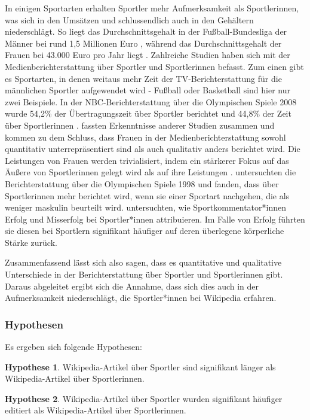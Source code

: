 \documentclass[11pt]{article}
\begin{document}
In einigen Sportarten erhalten Sportler mehr Aufmerksamkeit als Sportlerinnen, was sich in den Umsätzen und schlussendlich auch in den Gehältern niederschlägt. So liegt das Durchschnittsgehalt in der Fußball-Bundesliga der Männer bei rund 1,5 Millionen Euro \parencite{Harris2015}, während das Durchschnittsgehalt der Frauen bei 43.000 Euro pro Jahr liegt \parencite{soccerIncomeWomen}. Zahlreiche Studien haben sich mit der Medienberichterstattung über Sportler und Sportlerinnen befasst. Zum einen gibt es Sportarten, in denen weitaus mehr Zeit der TV-Berichterstattung für die männlichen Sportler aufgewendet wird - Fußball oder Basketball sind hier nur zwei Beispiele. In der NBC-Berichterstattung über die Olympischen Spiele 2008 wurde 54,2\% der Übertragungszeit über Sportler berichtet und 44,8\% der Zeit über Sportlerinnen \parencite{Billings2008}. \textcite{Trolan2013} fassten Erkenntnisse anderer Studien zusammen und kommen zu dem Schluss, dass Frauen in der Medienberichterstattung sowohl quantitativ unterrepräsentiert sind als auch qualitativ anders berichtet wird. Die Leistungen von Frauen werden trivialisiert, indem ein stärkerer Fokus auf das Äußere von Sportlerinnen gelegt wird als auf ihre Leistungen \parencite{Harris2005,Vincent2004}. \textcite{Jones1999} untersuchten die Berichterstattung über die Olympischen Spiele 1998 und fanden, dass über Sportlerinnen mehr berichtet wird, wenn sie einer Sportart nachgehen, die als weniger maskulin beurteilt wird. \textcite{Billings2008} untersuchten, wie Sportkommentator*innen Erfolg und Misserfolg bei Sportler*innen attribuieren. Im Falle von Erfolg führten sie diesen bei Sportlern signifikant häufiger auf deren überlegene körperliche Stärke zurück.

Zusammenfassend lässt sich also sagen, dass es quantitative und qualitative Unterschiede in der Berichterstattung über Sportler und Sportlerinnen gibt. Daraus abgeleitet ergibt sich die Annahme, dass sich dies auch in der Aufmerksamkeit niederschlägt, die Sportler*innen bei Wikipedia erfahren.

\subsubsection {Hypothesen}

Es ergeben sich folgende Hypothesen:

\textbf{Hypothese 1}. Wikipedia-Artikel über Sportler sind signifikant länger als Wikipedia-Artikel über Sportlerinnen.

\textbf{Hypothese 2}. Wikipedia-Artikel über Sportler wurden signifikant häufiger editiert als Wikipedia-Artikel über Sportlerinnen.
\end{document}
